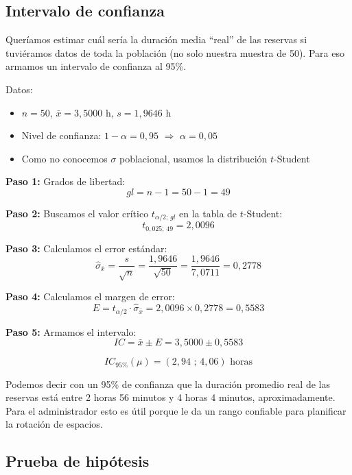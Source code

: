 \documentclass[12pt,a4paper]{article}
\begin{document}
\subsection{Intervalo de confianza}

Queríamos estimar cuál sería la duración media ``real'' de las reservas si tuviéramos datos de toda la población (no solo nuestra muestra de 50). Para eso armamos un intervalo de confianza al 95\%.

Datos:
\begin{itemize}[itemsep=4pt]
  \item $n = 50$, \quad $\bar{x} = 3{,}5000$ h, \quad $s = 1{,}9646$ h
  \item Nivel de confianza: $1 - \alpha = 0{,}95$ \quad $\Rightarrow$ \quad $\alpha = 0{,}05$
  \item Como no conocemos $\sigma$ poblacional, usamos la distribución $t$-Student
\end{itemize}

\vspace{6pt}
\textbf{Paso 1:} Grados de libertad:
$$gl = n - 1 = 50 - 1 = 49$$

\vspace{6pt}
\textbf{Paso 2:} Buscamos el valor crítico $t_{\alpha/2;\,gl}$ en la tabla de $t$-Student:
$$t_{0{,}025;\,49} = 2{,}0096$$

\vspace{6pt}
\textbf{Paso 3:} Calculamos el error estándar:
$$\hat{\sigma}_{\bar{x}} = \frac{s}{\sqrt{n}} = \frac{1{,}9646}{\sqrt{50}} = \frac{1{,}9646}{7{,}0711} = 0{,}2778$$

\vspace{6pt}
\textbf{Paso 4:} Calculamos el margen de error:
$$E = t_{\alpha/2} \cdot \hat{\sigma}_{\bar{x}} = 2{,}0096 \times 0{,}2778 = 0{,}5583$$

\vspace{6pt}
\textbf{Paso 5:} Armamos el intervalo:
$$IC = \bar{x} \pm E = 3{,}5000 \pm 0{,}5583$$

$$\boxed{IC_{95\%}(\mu) = (2{,}94 \text{ ; } 4{,}06) \text{ horas}}$$
\vspace{4pt}

Podemos decir con un 95\% de confianza que la duración promedio real de las reservas está entre 2 horas 56 minutos y 4 horas 4 minutos, aproximadamente. Para el administrador esto es útil porque le da un rango confiable para planificar la rotación de espacios.

\subsection{Prueba de hipótesis}
\end{document}

